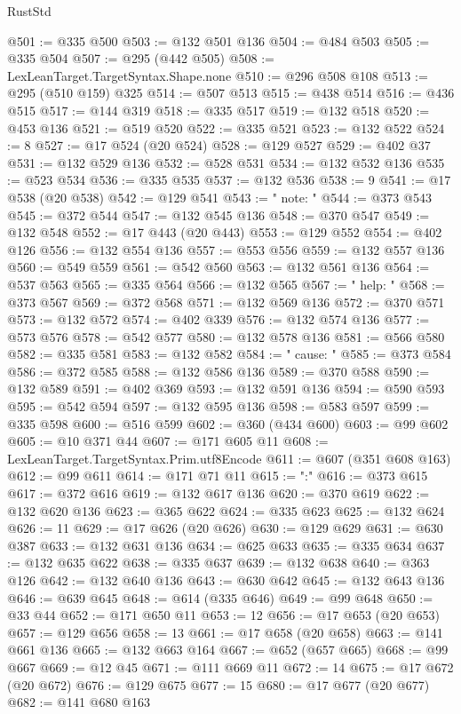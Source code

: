 \begin{lexlean}{RustStd}
\begin{coremodule}
{\begin{coremodule}
{{{{{{{{{{{{{{{{{{{{{{{{{{{{{{{@501 := @335 @500
@503 := @132 @501 @136
@504 := @484 @503
@505 := @335 @504
@507 := @295 (@442 @505)
@508 := LexLeanTarget.TargetSyntax.Shape.none
@510 := @296 @508 @108
@513 := @295 (@510 @159) @325
@514 := @507 @513
@515 := @438 @514
@516 := @436 @515
@517 := @144 @319
@518 := @335 @517
@519 := @132 @518
@520 := @453 @136
@521 := @519 @520
@522 := @335 @521
@523 := @132 @522
@524 := 8
@527 := @17 @524 (@20 @524)
@528 := @129 @527
@529 := @402 @37
@531 := @132 @529 @136
@532 := @528 @531
@534 := @132 @532 @136
@535 := @523 @534
@536 := @335 @535
@537 := @132 @536
@538 := 9
@541 := @17 @538 (@20 @538)
@542 := @129 @541
@543 := "  note: "
@544 := @373 @543
@545 := @372 @544
@547 := @132 @545 @136
@548 := @370 @547
@549 := @132 @548
@552 := @17 @443 (@20 @443)
@553 := @129 @552
@554 := @402 @126
@556 := @132 @554 @136
@557 := @553 @556
@559 := @132 @557 @136
@560 := @549 @559
@561 := @542 @560
@563 := @132 @561 @136
@564 := @537 @563
@565 := @335 @564
@566 := @132 @565
@567 := "  help: "
@568 := @373 @567
@569 := @372 @568
@571 := @132 @569 @136
@572 := @370 @571
@573 := @132 @572
@574 := @402 @339
@576 := @132 @574 @136
@577 := @573 @576
@578 := @542 @577
@580 := @132 @578 @136
@581 := @566 @580
@582 := @335 @581
@583 := @132 @582
@584 := "  cause: "
@585 := @373 @584
@586 := @372 @585
@588 := @132 @586 @136
@589 := @370 @588
@590 := @132 @589
@591 := @402 @369
@593 := @132 @591 @136
@594 := @590 @593
@595 := @542 @594
@597 := @132 @595 @136
@598 := @583 @597
@599 := @335 @598
@600 := @516 @599
@602 := @360 (@434 @600)
@603 := @99 @602
@605 := @10 @371 @44
@607 := @171 @605 @11
@608 := LexLeanTarget.TargetSyntax.Prim.utf8Encode
@611 := @607 (@351 @608 @163)
@612 := @99 @611
@614 := @171 @71 @11
@615 := ":"
@616 := @373 @615
@617 := @372 @616
@619 := @132 @617 @136
@620 := @370 @619
@622 := @132 @620 @136
@623 := @365 @622
@624 := @335 @623
@625 := @132 @624
@626 := 11
@629 := @17 @626 (@20 @626)
@630 := @129 @629
@631 := @630 @387
@633 := @132 @631 @136
@634 := @625 @633
@635 := @335 @634
@637 := @132 @635 @622
@638 := @335 @637
@639 := @132 @638
@640 := @363 @126
@642 := @132 @640 @136
@643 := @630 @642
@645 := @132 @643 @136
@646 := @639 @645
@648 := @614 (@335 @646)
@649 := @99 @648
@650 := @33 @44
@652 := @171 @650 @11
@653 := 12
@656 := @17 @653 (@20 @653)
@657 := @129 @656
@658 := 13
@661 := @17 @658 (@20 @658)
@663 := @141 @661 @136
@665 := @132 @663 @164
@667 := @652 (@657 @665)
@668 := @99 @667
@669 := @12 @45
@671 := @111 @669 @11
@672 := 14
@675 := @17 @672 (@20 @672)
@676 := @129 @675
@677 := 15
@680 := @17 @677 (@20 @677)
@682 := @141 @680 @163
}}}}}}}}}}}}}}}}}}}}}}}}}}}}}}}
\end{coremodule}}
\end{coremodule}
\end{lexlean}

